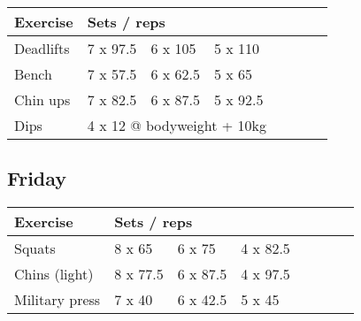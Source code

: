 \documentclass[12pt, a4paper]{article}%
\begin{document}
  \begin{tabular}{l|lllllll}
  \hspace{0.75em} \textbf{Exercise} & \multicolumn{ 7 }{l}{ \textbf{Sets / reps} } \\ \hline

            \hspace{0.75em} Deadlifts
            & 7 x 97.5
            & 6 x 105
            & 5 x 110
            & 
            & 
            & 
            & 
            \\


            \hspace{0.75em} Bench
            & 7 x 57.5
            & 6 x 62.5
            & 5 x 65
            & 
            & 
            & 
            & 
            \\


            \hspace{0.75em} Chin ups
            & 7 x 82.5
            & 6 x 87.5
            & 5 x 92.5
            & 
            & 
            & 
            & 
            \\


   \hspace{0.75em} Dips &  \multicolumn{ 7 }{l}{ 4 x 12 @ bodyweight + 10kg } \\
  \end{tabular}

  \subsection*{\hspace{0.5em} Friday }


  \begin{tabular}{l|lllllll}
  \hspace{0.75em} \textbf{Exercise} & \multicolumn{ 7 }{l}{ \textbf{Sets / reps} } \\ \hline

            \hspace{0.75em} Squats
            & 8 x 65
            & 6 x 75
            & 4 x 82.5
            & 
            & 
            & 
            & 
            \\


            \hspace{0.75em} Chins (light)
            & 8 x 77.5
            & 6 x 87.5
            & 4 x 97.5
            & 
            & 
            & 
            & 
            \\


            \hspace{0.75em} Military press
            & 7 x 40
            & 6 x 42.5
            & 5 x 45
            & 
            & 
            & 
            & 
            \\


  \end{tabular}
\end{document}

